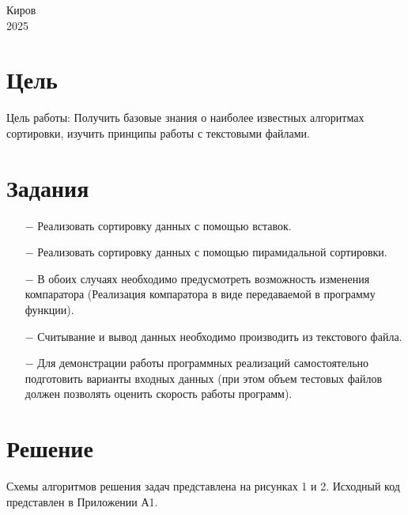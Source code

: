 \documentclass[oneside,a4paper,14pt]{extarticle}
\begin{document}
\begin{center}
	Киров\\
	2025
\end{center}

\newpage\thispagestyle{plain}

\section*{Цель}

Цель работы: Получить базовые знания о наиболее известных алгоритмах сортировки, изучить принципы работы с текстовыми файлами.

\section*{Задания}
\begin{itemize}
	\item[$-$] Реализовать сортировку данных с помощью вставок.
	\item[$-$] Реализовать сортировку данных с помощью пирамидальной сортировки.
	\item[$-$] В обоих случаях необходимо предусмотреть возможность изменения компаратора (Реализация компаратора в виде передаваемой в программу функции).
	\item[$-$] Считывание и вывод данных необходимо производить из текстового файла.
	\item[$-$] Для демонстрации работы программных реализаций самостоятельно подготовить варианты входных данных (при этом объем тестовых файлов должен позволять оценить скорость работы программ).
\end{itemize}

\section*{Решение}

Схемы алгоритмов решения задач представлена на рисунках 1 и 2. Исходный код представлен в Приложении А1.
\end{document}
